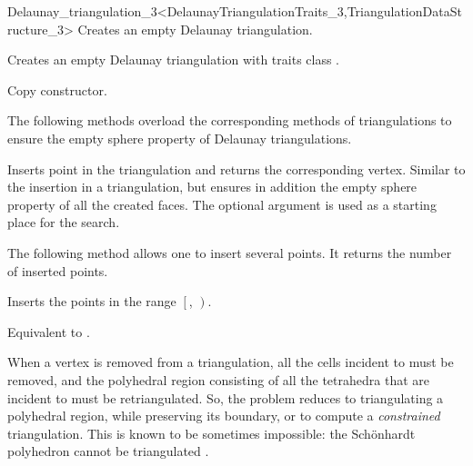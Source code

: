 \begin{ccRefClass}{Delaunay_triangulation_3<DelaunayTriangulationTraits_3,TriangulationDataStructure_3>}
{Creates an empty Delaunay triangulation.}

{Creates an empty Delaunay triangulation with traits class
.}

{Copy constructor.}

\ccOperations


The following methods overload the corresponding methods of
triangulations to ensure the empty sphere property of Delaunay 
triangulations.

{Inserts point  in the triangulation and returns the corresponding
 vertex. Similar to the insertion in a triangulation, but ensures in
addition the empty sphere property of all the created faces.
The optional argument  is used as a starting place for the search.}

The following method allows one to insert several points. It returns the
number of inserted points. 

{Inserts the points in the range $\left[\right.$,
$\left.\right)$. 
}

{Equivalent to .}


When a vertex  is removed from a triangulation, all the cells
incident to  must be removed, and the polyhedral region
consisting of all the tetrahedra that are incident to  must be
retriangulated. 
So, the problem reduces to triangulating a polyhedral
region, while preserving its boundary, or to compute a
\textit{constrained} triangulation. This is known to be sometimes
impossible: the Sch\"onhardt polyhedron cannot be triangulated
\cite{s-cgehd-98}. 


\end{ccRefClass}
